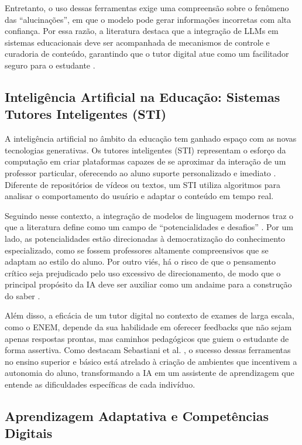 \documentclass[12pt]{article}
\begin{document}
Entretanto, o uso dessas ferramentas exige uma compreensão sobre o fenômeno das ``alucinações'', em que o modelo pode gerar informações incorretas com alta confiança. Por essa razão, a literatura destaca que a integração de LLMs em sistemas educacionais deve ser acompanhada de mecanismos de controle e curadoria de conteúdo, garantindo que o tutor digital atue como um facilitador seguro para o estudante \cite{sebastiani2023}.

\subsection{Inteligência Artificial na Educação: Sistemas Tutores Inteligentes (STI)}

A inteligência artificial no âmbito da educação tem ganhado espaço com as novas tecnologias generativas. Os tutores inteligentes (STI) representam o esforço da computação em criar plataformas capazes de se aproximar da interação de um professor particular, oferecendo ao aluno suporte personalizado e imediato \cite{unicamp2022}. Diferente de repositórios de vídeos ou textos, um STI utiliza algoritmos para analisar o comportamento do usuário e adaptar o conteúdo em tempo real.

Seguindo nesse contexto, a integração de modelos de linguagem modernos traz o que a literatura define como um campo de ``potencialidades e desafios'' \cite{bezerra2023}. Por um lado, as potencialidades estão direcionadas à democratização do conhecimento especializado, como se fossem professores altamente compreensivos que se adaptam ao estilo do aluno. Por outro viés, há o risco de que o pensamento crítico seja prejudicado pelo uso excessivo de direcionamento, de modo que o principal propósito da IA deve ser auxiliar como um andaime para a construção do saber \cite{bezerra2023}.

Além disso, a eficácia de um tutor digital no contexto de exames de larga escala, como o ENEM, depende da sua habilidade em oferecer feedbacks que não sejam apenas respostas prontas, mas caminhos pedagógicos que guiem o estudante de forma assertiva. Como destacam Sebastiani et al. \cite{sebastiani2023}, o sucesso dessas ferramentas no ensino superior e básico está atrelado à criação de ambientes que incentivem a autonomia do aluno, transformando a IA em um assistente de aprendizagem que entende as dificuldades específicas de cada indivíduo.

\subsection{Aprendizagem Adaptativa e Competências Digitais}
\end{document}
